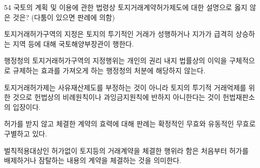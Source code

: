 \begin{question}{54}
국토의 계획 및 이용에 관한 법령상 토지거래계약허가제도에 대한 설명으로 옳지 않은 것은? (다툼이 있으면 판례에 의함)
\begin{choices}
  \item 토지거래허가구역의 지정은 토지의 투기적인 거래가 성행하거나 지가가 급격히 상승하는 지역 등에 대해 국토해양부장관이 행한다.
  \item 행정청의 토지거래허가구역의 지정행위는 개인의 권리 내지 법률상의 이익을 구체적으로 규제하는 효과를 가져오게 하는 행정청의 처분에 해당하지 않는다.
  \item 토지거래허가제는 사유재산제도를 부정하는 것이 아니라 토지의 투기적 거래억제를 위한 것으로 헌법상의 비례원칙이나 과잉금지원칙에 반하지 아니한다는 것이 헌법재판소의 입장이다.
  \item 허가를 받지 않고 체결한 계약의 효력에 대해 판례는 확정적인 무효와 유동적인 무효로 구별하고 있다.
  \item 벌칙적용대상인 허가없이 토지등의 거래계약을 체결한 행위라 함은 처음부터 허가를 배제하거나 잠탈하는 내용의 계약을 체결하는 것을 의미한다.
\end{choices}
\end{question}
